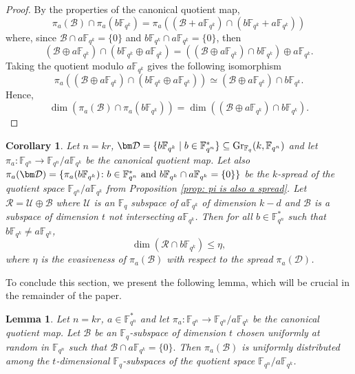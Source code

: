 \documentclass{article}
\newtheorem{lemma}{Lemma}
\newtheorem{corollary}{Corollary}
\newcommand{\F}{\mathbb{F}}
\newcommand{\Fq}{\mathbb{F}_{q}}
\newcommand{\Fqn}{\mathbb{F}_{q^n}}
\newcommand{\Fqk}{\mathbb{F}_{q^k}}
\newcommand{\calB}{\mathcal{B}}
\newcommand{\calD}{\mathcal{D}}
\newcommand{\calR}{\mathcal{R}}
\newcommand{\calU}{\mathcal{U}}
\begin{document}
\begin{proof}
By the properties of the canonical quotient map, 
\[
\pi_a(\calB)\cap\pi_a(
b\Fqk)
=
\pi_a(
(\calB +a\Fqk)
\cap
(b\Fqk + a\Fqk)
)
\]
where, since $\calB\cap a\Fqk=\{0\}$ and $b\Fqk\cap a\Fqk=\{0\}$, then
\[
(\calB\oplus a\Fqk)
\cap
(b\Fqk\oplus a\Fqk)
=
\left((\calB\oplus a\Fqk)
\cap
b\Fqk\right)
\oplus
a\Fqk.
\]
Taking the quotient modulo $a\Fqk$ gives the following
isomorphism
\[
\pi_a(
(\calB\oplus a\Fqk)
\cap
(b\Fqk\oplus a\Fqk)
)
\simeq 
(\calB\oplus a\Fqk)
\cap
b\Fqk.
\]
Hence,
\[
\dim\left(\pi_a(\calB)\cap\pi_a(b\Fqk)\right)
=
\dim\left((\mathcal{B}\oplus a\Fqk)\cap b\Fqk\right).
\]
\end{proof}
\begin{corollary}
    \label{cor: consequences on evasivness of the received space}
    Let $n=kr$, $\bm \calD = \{ b \Fqk \mid b \in \Fqn^* \} \subseteq \mathrm{Gr}_{\Fq}(k,\Fqn)$ and let $\pi_a\colon\Fqn\to\Fqn/a\Fqk$ be the canonical quotient map. Let also $\pi_a(\bm\calD)
=
\{\pi_a(b\Fqk)\colon  b\in\Fqn^*\text{ and }b\Fqk\cap a\Fqk=\{0\}\}$ be the $k$-spread of the quotient space $\Fqn/a\Fqk$ from Proposition \ref{prop: pi is also a spread}. Let $\calR =\calU\oplus\calB$ where $\calU$ is an $\Fq$ subspace of $a \Fqk$ of dimension $k-d$ and $\calB$ is a subspace of dimension $t$ not intersecting $a \Fqk$. Then for all 
$b \in \Fqn^*$ such that $b\Fqk \neq a\Fqk$, 
\begin{equation}
\label{eq:min_distance_decoder_maybe_success}
    \dim(\calR \cap b\Fqk) \leq \eta,
\end{equation}
where $\eta$ is the evasiveness of $\pi_a(\calB)$ with respect to the spread $\pi_a(\calD)$. 
\end{corollary}
To conclude this section, we present the following lemma, which will be crucial in the remainder of the paper. 
\begin{lemma}
\label{lemma: B random also piB random}
Let $n=kr$, $a\in\Fqn^*$ and let $\pi_a\colon\Fqn\to\Fqn/a\Fqk$ be the canonical quotient map. Let $\calB$ be an $\Fq$-subspace of dimension $t$ chosen uniformly at random in $\Fqn$ such that $\calB\cap a\Fqk=\{0\}.$
Then $\pi_a(\mathcal{B})$ is uniformly distributed among the
$t$-dimensional $\F_q$-subspaces of the quotient space $\Fqn/a\Fqk$.
\end{lemma}
\end{document}
